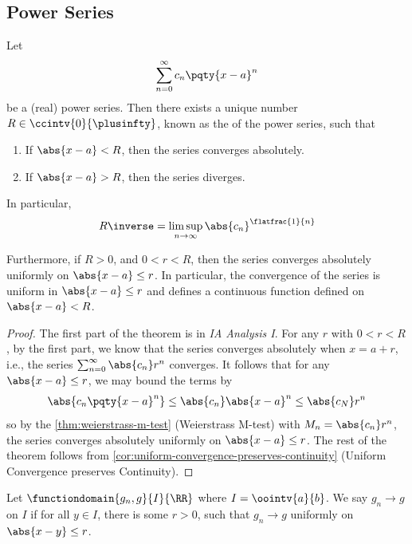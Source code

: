 \subsection{Power Series}

\begin{theorem}
    \label{thm:radius-of-convergence}%
    Let
    \[
        \sum_{n = 0}^{\infty} c_n \pqty{x - a} ^n
    \]
    be a (real) power series. Then there exists a unique number \(R \in \ccintv{0}{\plusinfty}\), known as the  of the power series, such that
    \begin{enumerate}[label=(\alph*)]
        \item If \(\abs{x - a} < R\), then the series converges absolutely.
        \item If \(\abs{x - a} > R\), then the series diverges.
    \end{enumerate}

    In particular,
    \[
        R\inverse = \limsup_{n \to \infty} \abs{c_n}^{\flatfrac{1}{n}}
    \]

    Furthermore, if \(R > 0\), and \(0 < r < R\), then the series converges absolutely uniformly on \(\abs{x - a} \leq r\). In particular, the convergence of the series is uniform in \(\abs{x - a} \leq r\) and defines a continuous function defined on \(\abs{x - a} < R\).
\end{theorem}

\begin{proof}
    The first part of the theorem is in \textit{IA Analysis I}. For any \(r\) with \(0 < r < R\), by the first part, we know that the series converges absolutely when \(x = a + r\), i.e., the series \(\sum_{n = 0}^{\infty} \abs{c_n} r^n\) converges. It follows that for any \(\abs{x - a} \leq r\), we may bound the terms by
    \[
        \abs{c_n \pqty{x - a}^n} \leq \abs{c_n} \abs{x - a}^{n} \leq \abs{c_N} r^n
    \]
    so by the \autoref{thm:weierstrass-m-test} (Weierstrass M-test) with \(M_n = \abs{c_n} r^n\), the series converges absolutely uniformly on \(\abs{x - a} \leq r\). The rest of the theorem follows from \autoref{cor:uniform-convergence-preserves-continuity} (Uniform Convergence preserves Continuity).
\end{proof}

\begin{definition}
    Let \(\functiondomain{g_n, g}{I}{\RR}\) where \(I = \oointv{a}{b}\). We say \(g_n \to g\)  on \(I\) if for all \(y \in I\), there is some \(r > 0\), such that \(g_n \to g\) uniformly on \(\abs{x - y} \leq r\).
\end{definition}

